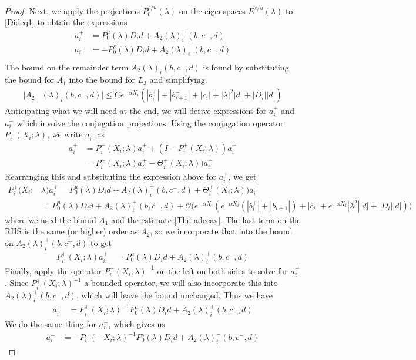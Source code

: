\documentclass[thesis.tex]{subfiles}
\begin{document}
\begin{lemma}
\begin{proof}
Next, we apply the projections $P_0^{s/u}(\lambda)$ on the eigenspaces $E^{s/u}(\lambda)$ to \eqref{Dideq1} to obtain the expressions
\begin{align*}
a_i^+ &= P_0^u(\lambda) D_i d + A_2(\lambda)_i^+(b, c^-, d) \\
a_i^- &= -P_0^s(\lambda) D_i d + A_2(\lambda)_i^-(b, c^-, d) \\
\end{align*}
The bound on the remainder term $A_2(\lambda)_i(b, c^-, d)$ is found by substituting the bound for $A_1$ into the bound for $L_3$ and simplifying. 
\begin{align*}
|A_2&(\lambda)_i(b, c^-, d)|
\leq C e^{-\alpha X_i} \left( |b_i^+| + |b_{i+1}^-| + |c_i| + |\lambda|^2|d| + |D_i||d| \right)
\end{align*} 
Anticipating what we will need at the end, we will derive expressions for $a_i^+$ and $a_i^-$ which involve the conjugation projections. Using the conjugation operator $P_i^+(X_i; \lambda)$, we write $a_i^+$ as
\begin{align*}
a_i^+ 
&= P_i^+(X_i; \lambda)a_i^+ + (I - P_i^+(X_i; \lambda))a_i^+ \\
&= P_i^+(X_i; \lambda)a_i^+ - \Theta_i^+(X_i; \lambda))a_i^+
\end{align*}
Rearranging this and substituting the expression above for $a_i^+$, we get
\begin{align*}
P_i^+(X_i; &\lambda) a_i^+ = P_0^u(\lambda) D_i d + A_2(\lambda)_i^+(b, c^-, d) + \Theta_i^+(X_i; \lambda))a_i^+ \\
&= P_0^u(\lambda) D_i d + A_2(\lambda)_i^+(b, c^-, d) + \mathcal{O}\Big( e^{-\alpha X_i} ( e^{-\alpha X_i} (|b_i^+| + |b_{i+1}^-|) + |c_i| + e^{-\alpha X_i} |\lambda^2||d| + |D_i||d| )\Big)
\end{align*}
where we used the bound $A_1$ and the estimate \eqref{Thetadecay}. The last term on the RHS is the same (or higher) order as $A_2$, so we incorporate that into the bound on $A_2(\lambda)_i^+(b, c^-, d)$ to get
\begin{align*}
P_i^+(X_i; \lambda)a_i^+ &= P_0^u(\lambda) D_i d + A_2(\lambda)_i^+(b, c^-, d)
\end{align*}
Finally, apply the operator $P_i^+(X_i; \lambda)^{-1}$ on the left on both sides to solve for $a_i^+$. Since $P_i^+(X_i; \lambda)^{-1}$ a bounded operator, we will also incorporate this into $A_2(\lambda)_i^+(b, c^-, d)$, which will leave the bound unchanged. Thus we have
\begin{align*}
a_i^+ &= P_i^+(X_i; \lambda)^{-1} P_0^u(\lambda) D_i d + A_2(\lambda)_i^+(b, c^-, d)
\end{align*}
We do the same thing for $a_i^-$, which gives us
\begin{align*}
a_i^- &= -P_i^-(-X_i; \lambda)^{-1} P_0^s(\lambda) D_i d + A_2(\lambda)_i^-(b, c^-, d)
\end{align*}


\end{proof}
\end{lemma}
\end{document}
